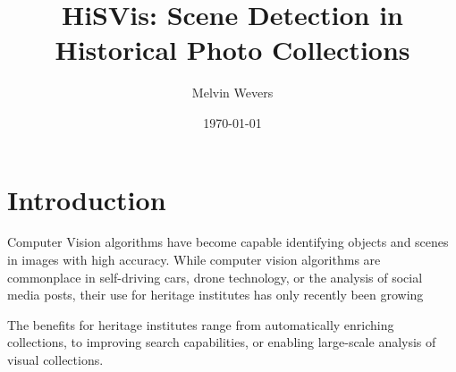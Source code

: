 \documentclass[a4paper]{article}
\title{HiSVis: Scene Detection in Historical Photo Collections}
\author{Melvin Wevers}
\date{\today}
\begin{document}
 
\maketitle
 
\section{Introduction}
Computer Vision algorithms have become capable identifying objects and scenes in images with high accuracy. While computer vision algorithms are commonplace in self-driving cars, drone technology, or the analysis of social media posts, their use for heritage institutes has only recently been growing\autocite{bhargav_deep_2019}



The benefits for heritage institutes range from automatically enriching collections, to improving search capabilities, or enabling large-scale analysis of visual collections. 
\end{document}
